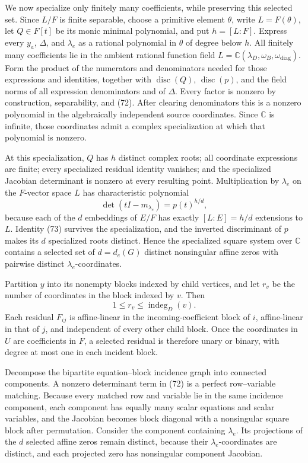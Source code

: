 We now specialize only finitely many coefficients, while preserving this selected set.  Since \(L/F\) is finite separable, choose a primitive element \(\theta\), write \(L=F(\theta)\), let \(Q\in F[t]\) be its monic minimal polynomial, and put \(h=[L:F]\).  Express every \(y_a\), \(\Delta\), and \(\lambda_e\) as a rational polynomial in \(\theta\) of degree below \(h\).  All finitely many coefficients lie in the ambient rational function field \(L=\mathbb C(\lambda_D,\omega_B,\omega_{\mathrm{diag}})\).  Form the product of the numerators and denominators needed for those expressions and identities, together with \(\operatorname{disc}(Q)\), \(\operatorname{disc}(p)\), and the field norms of all expression denominators and of \(\Delta\).  Every factor is nonzero by construction, separability, and (72).  After clearing denominators this is a nonzero polynomial in the algebraically independent source coordinates.  Since \(\mathbb C\) is infinite, those coordinates admit a complex specialization at which that polynomial is nonzero.

At this specialization, \(Q\) has \(h\) distinct complex roots; all coordinate expressions are finite; every specialized residual identity vanishes; and the specialized Jacobian determinant is nonzero at every resulting point.  Multiplication by \(\lambda_e\) on the \(F\)-vector space \(L\) has characteristic polynomial
\[
 \det(tI-m_{\lambda_e})=p(t)^{h/d},
\tag{73}
\]
because each of the \(d\) embeddings of \(E/F\) has exactly \([L:E]=h/d\) extensions to \(L\).  Identity (73) survives the specialization, and the inverted discriminant of \(p\) makes its \(d\) specialized roots distinct.  Hence the specialized square system over \(\mathbb C\) contains a selected set of \(d=d_e(G)\) distinct nonsingular affine zeros with pairwise distinct \(\lambda_e\)-coordinates.

Partition \(y\) into its nonempty blocks indexed by child vertices, and let \(r_v\) be the number of coordinates in the block indexed by \(v\).  Then
\[
 1\leq r_v\leq\operatorname{indeg}_D(v).
\tag{74}
\]
Each residual \(F_{ij}\) is affine-linear in the incoming-coefficient block of \(i\), affine-linear in that of \(j\), and independent of every other child block.  Once the coordinates in \(U\) are coefficients in \(F\), a selected residual is therefore unary or binary, with degree at most one in each incident block.

Decompose the bipartite equation--block incidence graph into connected components.  A nonzero determinant term in (72) is a perfect row--variable matching.  Because every matched row and variable lie in the same incidence component, each component has equally many scalar equations and scalar variables, and the Jacobian becomes block diagonal with a nonsingular square block after permutation.  Consider the component containing \(\lambda_e\).  Its projections of the \(d\) selected affine zeros remain distinct, because their \(\lambda_e\)-coordinates are distinct, and each projected zero has nonsingular component Jacobian.

